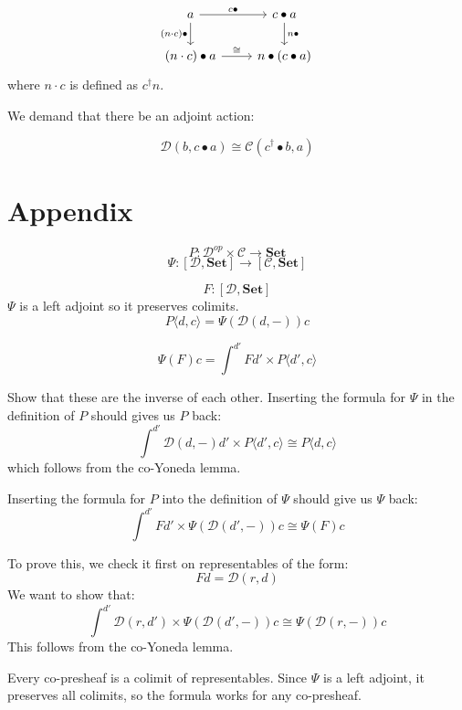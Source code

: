 \documentclass[11pt]{amsart}
\newcommand{\cat}[1]{\mathcal{#1}}%
\newcommand{\Cat}[1]{\mathbf{#1}}%
\newcommand{\Set}{\Cat{Set}}
\begin{document}
\[
 \begin{tikzcd}
 a
 \arrow [r, "c \bullet"] 
 \arrow [d, "(n \cdot c) \bullet"']
 & c \bullet a
 \arrow [d, "n \bullet"]
 \\
 (n \cdot c) \bullet a
 \arrow [r, "\cong"]
 & n \bullet (c \bullet a)
 \end{tikzcd}
\]
where $n \cdot c$ is defined as $c^{\dagger} n$.

We demand that there be an adjoint action:

\[ \cat D (b, c \bullet a) \cong \cat C (c^{\dagger} \bullet b, a) \]

\section{Appendix}

\[P \colon \cat D^{op} \times \cat C \to \Set \]
\[ \Psi \colon [\cat D, \Set] \to [\cat C, \Set] \]


\[ F \colon [\cat D, \Set] \]
$\Psi$ is a left adjoint so it preserves colimits.
\[P \langle d, c \rangle = \Psi ( \cat D(d, -)) c \]


\[ \Psi (F) c = \int^{d'} F d' \times P \langle d', c \rangle \]

Show that these are the inverse of each other. Inserting the formula for $\Psi$ in the definition of $P$ should gives us $P$ back:
\[  \int^{d'} \cat D(d, -) d' \times P\langle d', c \rangle \cong  P \langle d, c \rangle \]
which follows from the co-Yoneda lemma.

Inserting the formula for $P$ into the definition of $\Psi$ should give us $\Psi$ back:
\[  \int^{d'} F d' \times \Psi(\cat D(d', -)) c  \cong \Psi (F) c  \]


To prove this, we check it first on representables of the form:
\[ F d = \cat D (r, d) \]
We want to show that:
\[ \int^{d'}  \cat D (r, d')  \times  \Psi(\cat D(d', -)) c \cong  \Psi ( \cat D (r, -) ) c\]
This follows from the co-Yoneda lemma.

Every co-presheaf is a colimit of representables. Since $\Psi$ is a left adjoint, it preserves all colimits, so the formula works for any co-presheaf.
\end{document}
